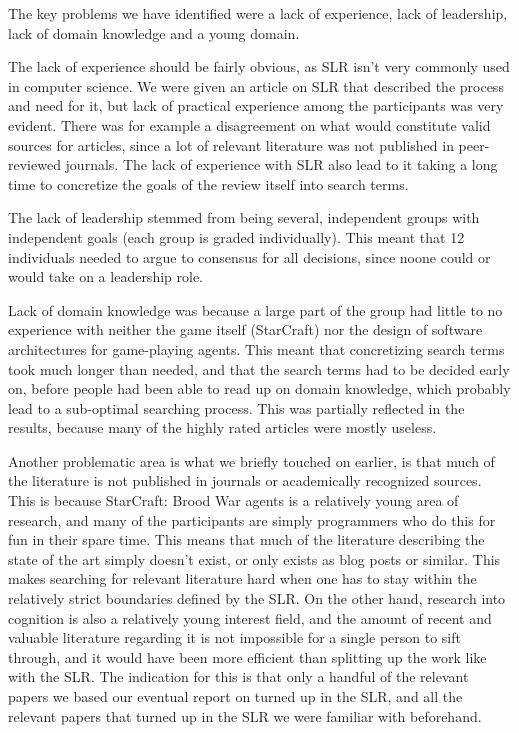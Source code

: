 The key problems we have identified were a lack of experience, lack of
leadership, lack of domain knowledge and a young domain.

The lack of experience should be fairly obvious, as SLR isn't very commonly
used in computer science. We were given an article on SLR that described the
process and need for it, but lack of practical experience among the
participants was very evident. There was for example a disagreement on what
would constitute valid sources for articles, since a lot of relevant literature
was not published in peer-reviewed journals. The lack of
experience with SLR also lead to it taking a long time to concretize the goals
of the review itself into search terms.

The lack of leadership stemmed from being several, independent groups with
independent goals (each group is graded individually). This meant that 12
individuals needed to argue to consensus for all decisions, since noone could
or would take on a leadership role.

Lack of domain knowledge was because a large part of the group had little to no
experience with neither the game itself (StarCraft) nor the design of software
architectures for game-playing agents. This meant that concretizing search
terms took much longer than needed, and that the search terms had to be
decided early on, before people had been able to read up on domain knowledge,
which probably lead to a sub-optimal searching process. This was partially
reflected in the results, because many of the highly rated articles were mostly
useless.

Another problematic area is what we briefly touched on earlier, is that much of
the literature is not published in journals or academically recognized sources.
This is because StarCraft: Brood War agents is a relatively young area of
research, and many of the participants are simply programmers who do this for
fun in their spare time. This means that much of the literature describing the
state of the art simply doesn't exist, or only exists as blog posts or similar.
This makes searching for relevant literature hard when one has to stay within
the relatively strict boundaries defined by the SLR. On the other hand,
research into cognition is also a relatively young interest field, and the
amount of recent and valuable literature regarding it is not impossible for a
single person to sift through, and it would have been more efficient than
splitting up the work like with the SLR. The indication for this is that only a
handful of the relevant papers we based our eventual report on turned up in the
SLR, and all the relevant papers that turned up in the SLR we were familiar
with beforehand.

